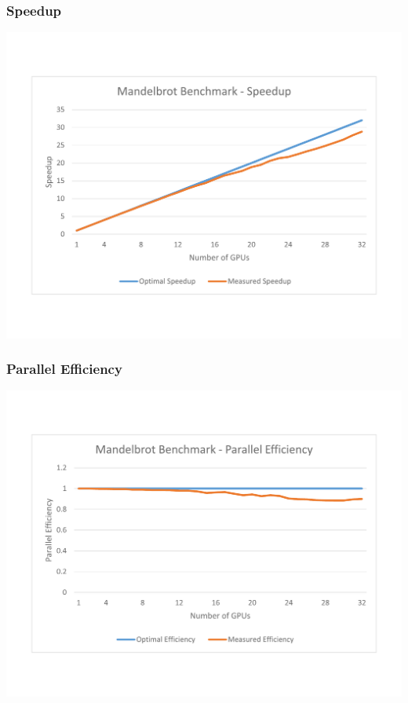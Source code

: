 \documentclass{beamer}
\begin{document}
\begin{frame}
    \frametitle{Speedup}
    \begin{center}
        \includegraphics[width=\textwidth]{../2014-09-25_gputalk/Mandelbrot_bench_stampede.pdf}
    \end{center}
\end{frame}

\begin{frame}
    \frametitle{Parallel Efficiency}
    \begin{center}
        \includegraphics[width=\textwidth]{../2014-09-25_gputalk/Mandelbrot_bench_stampede_2.pdf}
    \end{center}
\end{frame}
\end{document}
